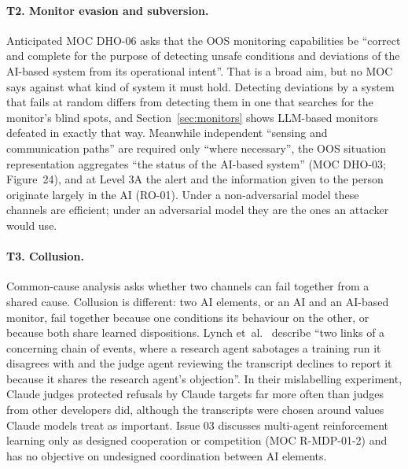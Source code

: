 \documentclass[11pt]{article}
\begin{document}
\paragraph{T2. Monitor evasion and subversion.} Anticipated MOC DHO-06 asks that the OOS monitoring capabilities be ``correct and complete for the purpose of detecting unsafe conditions and deviations of the AI-based system from its operational intent''. That is a broad aim, but no MOC says against what kind of system it must hold. Detecting deviations by a system that fails at random differs from detecting them in one that searches for the monitor's blind spots, and Section~\ref{sec:monitors} shows LLM-based monitors defeated in exactly that way. Meanwhile independent ``sensing and communication paths'' are required only ``where necessary'', the OOS situation representation aggregates ``the status of the AI-based system'' (MOC DHO-03; Figure~24), and at Level 3A the alert and the information given to the person originate largely in the AI (RO-01). Under a non-adversarial model these channels are efficient; under an adversarial model they are the ones an attacker would use.

\paragraph{T3. Collusion.} Common-cause analysis asks whether two channels can fail together from a shared cause. Collusion is different: two AI elements, or an AI and an AI-based monitor, fail together because one conditions its behaviour on the other, or because both share learned dispositions. Lynch et~al.~\cite{lynch2026agentic} describe ``two links of a concerning chain of events, where a research agent sabotages a training run it disagrees with and the judge agent reviewing the transcript declines to report it because it shares the research agent's objection''. In their mislabelling experiment, Claude judges protected refusals by Claude targets far more often than judges from other developers did, although the transcripts were chosen around values Claude models treat as important. Issue 03 discusses multi-agent reinforcement learning only as designed cooperation or competition (MOC R-MDP-01-2) and has no objective on undesigned coordination between AI elements.
\end{document}
